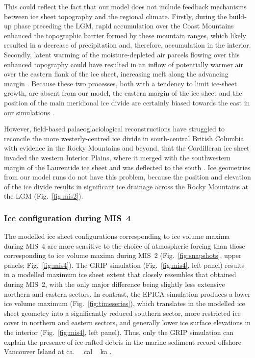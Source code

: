 \documentclass[tc]{copernicus}
\begin{document}
This could reflect the fact that our model does not include
feedback mechanisms between ice sheet topography and the regional climate.
Firstly, during the build-up phase preceding the LGM, rapid accumulation over
the Coast Mountains enhanced the topographic barrier formed by these mountain
ranges, which likely resulted in a decrease of precipitation and, therefore,
accumulation in the interior. Secondly, latent warming of the moisture-depleted
air parcels flowing over this enhanced topography could have resulted in an
inflow of potentially warmer air over the eastern flank of the ice sheet,
increasing melt
along the advancing margin \citep[cf.][]{Langen.etal.2012}. Because these two
processes, both with a tendency to limit ice-sheet growth, are absent from
our model, the
eastern margin of the ice sheet and the position of the main meridional ice
divide are certainly biased towards the east in our simulations
\citep{Seguinot.etal.2014}.

However, field-based palaeoglaciological reconstructions have
struggled to reconcile the more westerly-centred ice divide in south-central
British Columbia with evidence in the Rocky Mountains and beyond, that the
Cordilleran ice sheet invaded the western Interior Plains, where it merged with
the southwestern margin of the Laurentide ice sheet and was deflected to the
south \citep{Jackson.etal.1997, Bednarski.Smith.2007, Kleman.etal.2010,
Margold.etal.2013, Margold.etal.2013a}. Ice geometries from our model runs do
not have this problem, because the position and elevation of the ice divide
results in significant ice drainage across the Rocky Mountains at the LGM
(Fig.~\ref{fig:mis2}).


\subsubsection{Ice configuration during MIS~4}
\label{sec:mis4}

The modelled ice sheet configurations corresponding to ice volume maxima during
MIS~4 are more sensitive to the choice of atmospheric forcing than those
corresponding to ice volume maxima during MIS~2 (Fig.~\ref{fig:snapshots},
upper panels;
Fig.~\ref{fig:mis4}). The GRIP simulation (Fig.~\ref{fig:mis4}, left panel)
results in a modelled maximum ice sheet extent that closely resembles that
obtained
during MIS~2, with the only major difference being slightly less extensive
northern and eastern sectors. In contrast, the EPICA simulation produces a lower
ice volume maximum (Fig.~\ref{fig:timeseries}), which translates in the
modelled ice sheet geometry into a significantly reduced southern sector, more
restricted ice cover in northern and eastern sectors, and generally lower
ice surface elevations in the interior (Fig.~\ref{fig:mis4}, left panel).
Thus, only the GRIP simulation can explain the presence of ice-rafted debris
in the marine sediment record offshore Vancouver Island at
ca.\,\unit{\,cal\,ka} \citep{Cosma.etal.2008}.
\end{document}
